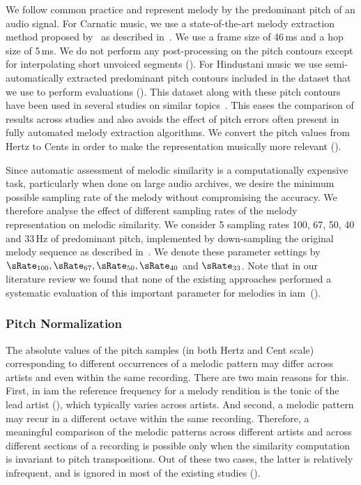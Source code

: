 We follow common practice and represent melody by the predominant pitch of an audio signal. For Carnatic music, we use a state-of-the-art melody extraction method proposed by~\cite{Salamon2012} as described in~. We use a frame size of 46\,ms and a hop size of 5\,ms. We do not perform any post-processing on the pitch contours except for interpolating short unvoiced segments (). For Hindustani music we use semi-automatically extracted predominant pitch contours included in the dataset that we use to perform evaluations (). This dataset along with these pitch contours have been used in several studies on similar topics~\citep{Rao2014,Ross2012b,Ross2012}. This eases the comparison of results across studies and also avoids the effect of pitch errors often present in fully automated melody extraction algorithms. We convert the pitch values from Hertz to Cents in order to make the representation musically more relevant ().

Since automatic assessment of melodic similarity is a computationally expensive task, particularly when done on large audio archives, we desire the minimum possible sampling rate of the melody without compromising the accuracy. We therefore analyse the effect of different sampling rates of the melody representation on melodic similarity. We consider 5 sampling rates 100, 67, 50, 40 and 33\,Hz of predominant pitch, implemented by down-sampling the original melody sequence as described in~. We denote these parameter settings by $\sRate_{100}, \sRate_{67}, \sRate_{50}, \sRate_{40}$ and $\sRate_{33}$. Note that in our literature review we found that none of the existing approaches performed a systematic evaluation of this important parameter for melodies in \gls{iam}~().

\subsubsection{Pitch Normalization}
\label{sec:patterns_melodic_similarity_transposition_invariance}

The absolute values of the pitch samples (in both Hertz and Cent scale) corresponding to different occurrences of a melodic pattern may differ across artists and even within the same recording. There are two main reasons for this. First, in \gls{iam} the reference frequency for a melody rendition is the tonic of the lead artist (), which typically varies across artists. And second, a melodic pattern may recur in a different octave within the same recording. Therefore, a meaningful comparison of the melodic patterns across different artists and across different sections of a recording is possible only when the similarity computation is invariant to pitch transpositions. Out of these two cases, the latter is relatively infrequent, and is ignored in most of the existing studies ().

